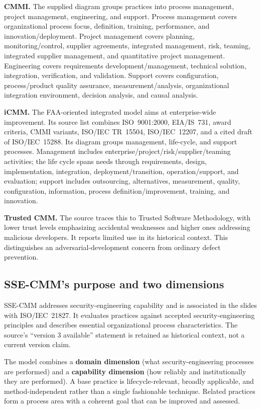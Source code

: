 \documentclass[11pt,a4paper]{article}
\numberwithin{figure}{section}
\begin{document}
\textbf{CMMI.} The supplied diagram groups practices into process management, project management, engineering, and support. Process management covers organizational process focus, definition, training, performance, and innovation/deployment. Project management covers planning, monitoring/control, supplier agreements, integrated management, risk, teaming, integrated supplier management, and quantitative project management. Engineering covers requirements development/management, technical solution, integration, verification, and validation. Support covers configuration, process/product quality assurance, measurement/analysis, organizational integration environment, decision analysis, and causal analysis.

\textbf{iCMM.} The FAA-oriented integrated model aims at enterprise-wide improvement. Its source list combines ISO~9001:2000, EIA/IS~731, award criteria, CMMI variants, ISO/IEC TR~15504, ISO/IEC~12207, and a cited draft of ISO/IEC~15288. Its diagram groups management, life-cycle, and support processes. Management includes enterprise/project/risk/supplier/teaming activities; the life cycle spans needs through requirements, design, implementation, integration, deployment/transition, operation/support, and evaluation; support includes outsourcing, alternatives, measurement, quality, configuration, information, process definition/improvement, training, and innovation.

\textbf{Trusted CMM.} The source traces this to Trusted Software Methodology, with lower trust levels emphasizing accidental weaknesses and higher ones addressing malicious developers. It reports limited use in its historical context. This distinguishes an adversarial-development concern from ordinary defect prevention.

\subsection{SSE-CMM's purpose and two dimensions}
SSE-CMM addresses security-engineering capability and is associated in the slides with ISO/IEC~21827. It evaluates practices against accepted security-engineering principles and describes essential organizational process characteristics. The source's ``version 3 available'' statement is retained as historical context, not a current version claim.

The model combines a \textbf{domain dimension} (what security-engineering processes are performed) and a \textbf{capability dimension} (how reliably and institutionally they are performed). A base practice is lifecycle-relevant, broadly applicable, and method-independent rather than a single fashionable technique. Related practices form a process area with a coherent goal that can be improved and assessed.
\end{document}
